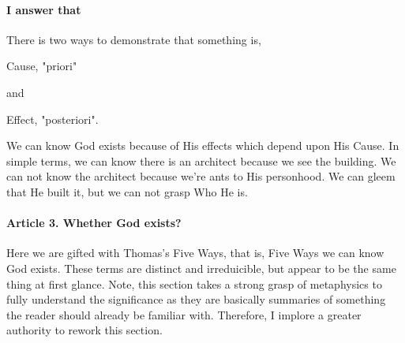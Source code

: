 \documentclass{ucetd}
\begin{document}
\paragraph{I answer that}
There is two ways to demonstrate that something is, 

Cause, "priori"

and

Effect, "posteriori".

We can know God exists because of His effects which depend upon His Cause. In simple terms, we can know there is an architect because we see the building. We can not know the architect because we're ants to His personhood. We can gleem that He built it, but we can not grasp Who He is.

\paragraph{Article 3. Whether God exists?}
Here we are gifted with Thomas's Five Ways, that is, Five Ways we can know God exists. These terms are distinct and irreduicible, but appear to be the same thing at first glance. Note, this section takes a strong grasp of metaphysics to fully understand the significance as they are basically summaries of something the reader should already be familiar with. Therefore, I implore a greater authority to rework this section.
\end{document}
